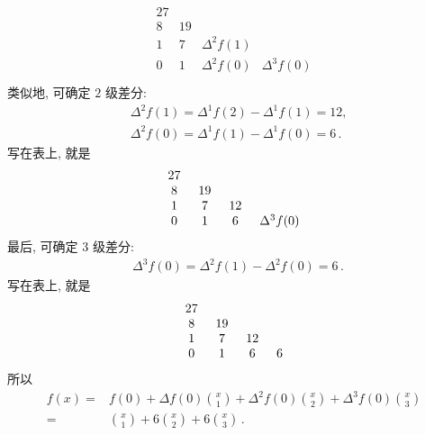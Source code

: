 \begin{example}
\begin{align*}
\begin{array}{cccc}
            27 & \  & \               & \               \\
            8  & 19 & \               & \               \\
            1  & 7  & \Delta^{2} f(1) & \               \\
            0  & 1  & \Delta^{2} f(0) & \Delta^{3} f(0) \\
        \end{array}
    \end{align*}
    类似地, 可确定 $2$ 级差分:
    \begin{align*}
         & \Delta^{2} f(1) = \Delta^{1} f(2) - \Delta^{1} f(1) = 12,       \\
         & \Delta^{2} f(0) = \Delta^{1} f(1) - \Delta^{1} f(0) = 6 \period
    \end{align*}
    写在表上, 就是
    \begin{align*}
        \arraycolsep=0.25cm
        \begin{array}{cccc}
            27 & \  & \  & \               \\
            8  & 19 & \  & \               \\
            1  & 7  & 12 & \               \\
            0  & 1  & 6  & \Delta^{3} f(0) \\
        \end{array}
    \end{align*}
    最后, 可确定 $3$ 级差分:
    \begin{align*}
         & \Delta^{3} f(0) = \Delta^{2} f(1) - \Delta^{2} f(0) = 6 \period
    \end{align*}
    写在表上, 就是
    \begin{align*}
        \arraycolsep=0.25cm
        \begin{array}{cccc}
            27 & \  & \  & \ \\
            8  & 19 & \  & \ \\
            1  & 7  & 12 & \ \\
            0  & 1  & 6  & 6 \\
        \end{array}
    \end{align*}
    所以
    \begin{align*}
        f(x)
        = {} & f(0) + \Delta f(0) \binom{x}{1} + \Delta^2 f(0) \binom{x}{2} + \Delta^3 f(0) \binom{x}{3} \\
        = {} & \binom{x}{1} + 6 \binom{x}{2} + 6 \binom{x}{3} \period
    \end{align*}

\end{example}
